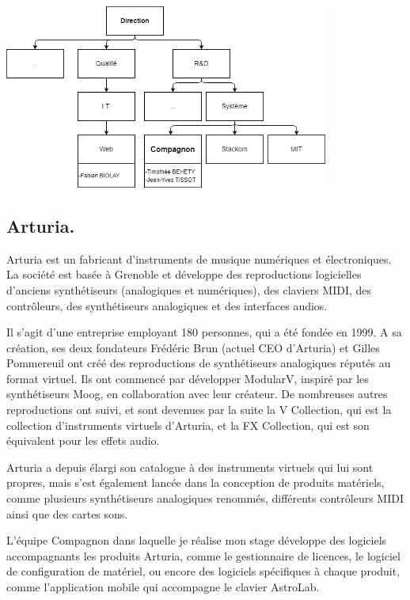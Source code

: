\documentclass[francais]{rapportPFE}  %
\begin{document}
\begin{center}
	\centering
	\includegraphics[width=0.8\textwidth]{graphics/organigramme.png}
	\begin{tiny}
	\end{tiny}
	\label{fig}
\end{center}


\subsection{Arturia.}

Arturia est un fabricant d'instruments de musique numériques et électroniques. La société est basée à Grenoble et développe des reproductions logicielles d'anciens synthétiseurs (analogiques et numériques), des claviers MIDI, des contrôleurs, des synthétiseurs analogiques et des interfaces audios. 

Il s'agit d'une entreprise employant 180 personnes, qui a été fondée en 1999. A sa création, ses deux fondateurs Frédéric Brun (actuel CEO d'Arturia) et Gilles Pommereuil ont créé des reproductions de synthétiseurs analogiques réputés au format virtuel. Ils ont commencé par développer ModularV, inspiré par les synthétiseurs Moog, en collaboration avec leur créateur. De nombreuses autres reproductions ont suivi, et sont devenues par la suite la V Collection, qui est la collection d'instruments virtuels d'Arturia, et la FX Collection, qui est son équivalent pour les effets audio.

Arturia a depuis élargi son catalogue à des instruments virtuels qui lui sont propres, mais s'est également lancée dans la conception de produits matériels, comme plusieurs synthétiseurs analogiques renommés, différents contrôleurs MIDI ainsi que des cartes sons. 

L'équipe Compagnon dans laquelle je réalise mon stage développe des logiciels accompagnants les produits Arturia, comme le gestionnaire de licences, le logiciel de configuration de matériel, ou encore des logiciels spécifiques à chaque produit, comme l'application mobile qui accompagne le clavier AstroLab. 
\end{document}
